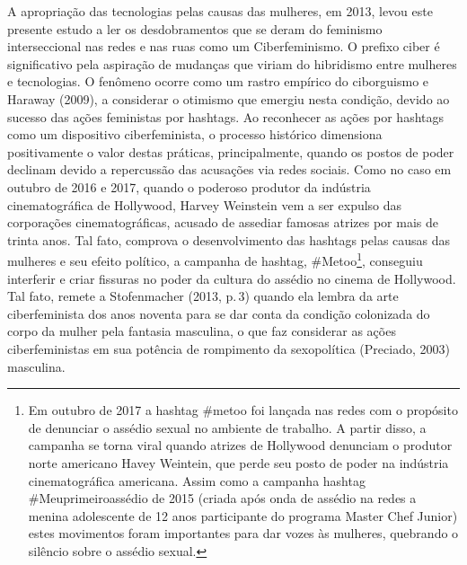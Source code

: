 A apropriação das tecnologias pelas causas das mulheres, em 2013, levou
este presente estudo a ler os desdobramentos que se deram do feminismo
interseccional nas redes e nas ruas como um Ciberfeminismo. O prefixo
ciber é significativo pela aspiração de mudanças que viriam do
hibridismo entre mulheres e tecnologias. O fenômeno ocorre como um
rastro empírico do ciborguismo e Haraway (2009), a considerar o otimismo
que emergiu nesta condição, devido ao sucesso das ações feministas por
hashtags. Ao reconhecer as ações por hashtags como um dispositivo
ciberfeminista, o processo histórico dimensiona positivamente o valor
destas práticas, principalmente, quando os postos de poder declinam
devido a repercussão das acusações via redes sociais. Como no caso em
outubro de 2016 e 2017, quando o poderoso produtor da indústria
cinematográfica de Hollywood, Harvey Weinstein vem a ser expulso das
corporações cinematográficas, acusado de assediar famosas atrizes por
mais de trinta anos. Tal fato, comprova o desenvolvimento das hashtags
pelas causas das mulheres e seu efeito político, a campanha de hashtag,
\#Metoo\footnote{Em outubro de 2017 a hashtag \#metoo foi lançada nas
  redes com o propósito de denunciar o assédio sexual no ambiente de
  trabalho. A partir disso, a campanha se torna viral quando atrizes de
  Hollywood denunciam o produtor norte americano Havey Weintein, que
  perde seu posto de poder na indústria cinematográfica americana. Assim
  como a campanha hashtag \#Meuprimeiroassédio de 2015 (criada após onda
  de assédio na redes a menina adolescente de 12 anos participante do
  programa Master Chef Junior) estes movimentos foram importantes para
  dar vozes às mulheres, quebrando o silêncio sobre o assédio sexual.},
conseguiu interferir e criar fissuras no poder da cultura do assédio no
cinema de Hollywood. Tal fato, remete a Stofenmacher (2013, p.\,3) quando
ela lembra da arte ciberfeminista dos anos noventa para se dar conta da
condição colonizada do corpo da mulher pela fantasia masculina, o que
faz considerar as ações ciberfeministas em sua potência de rompimento da
sexopolítica (Preciado, 2003) masculina.

